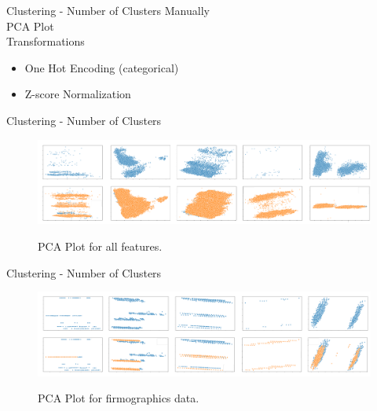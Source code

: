 
\begin{frame}{Clustering - Number of Clusters} \pause
    Manually \\  \pause
    \vspace{0.5cm}
    PCA Plot \\ \pause
    \vspace{0.5cm}
    Transformations \\ \pause
        \begin{itemize}
            \item One Hot Encoding (categorical) \pause
            \item Z-score Normalization 
        \end{itemize}
\end{frame}


\begin{frame}{Clustering - Number of Clusters}
    \begin{figure}
        \centering
        \caption{PCA Plot for all features.} 
        \includegraphics[width=\linewidth]{fig/ch3-pca-plot-all-features.png}
        \label{fig:pca-plot:all-features}
    \end{figure}
\end{frame}


\begin{frame}{Clustering - Number of Clusters} 
    \begin{figure}
        \caption{PCA Plot for firmographics data.}
        \centering
        \includegraphics[width=\linewidth]{fig/ch3-pca-plot-firmographics.png}
        \label{fig:pca-plot:firmographics}
    \end{figure}
\end{frame}

